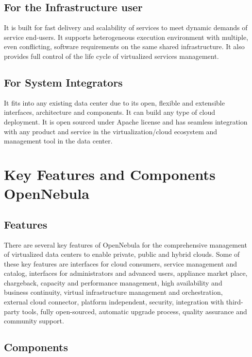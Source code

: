 \documentclass[9pt,twocolumn,twoside]{../../styles/osajnl}
\begin{document}
\subsection{For the Infrastructure user}

It is built for fast delivery and scalability of services to meet 
dynamic demands of service end-users. It supports heterogeneous 
execution environment with multiple, even conflicting, software 
requirements on the same shared infrastructure. It also provides full 
control of the life cycle of virtualized services management.

\subsection{For System Integrators}

It fits into any existing data center due to its open, flexible and 
extensible interfaces, architecture and components. It can build any 
type of cloud deployment. It is open sourced under Apache license and 
has seamless integration with any product and service in the 
virtualization/cloud ecosystem and management tool in the data 
center.

\section{Key Features and Components OpenNebula}

\subsection{Features}
There are several key {features of 
OpenNebula}\cite{www-features-opennebula} for the comprehensive 
management of virtualized data centers to enable private, public and 
hybrid clouds. Some of these key features are interfaces for cloud 
consumers, service management and catalog, interfaces for 
administrators and advanced users, appliance market place, 
chargeback, capacity and performance management, high availability 
and business continuity, virtual infrastructure management and 
orchestration, external cloud connector, platform independent, 
security, integration with third-party tools, fully open-sourced, 
automatic upgrade process, quality assurance and community support.

\subsection{Components}
\end{document}
